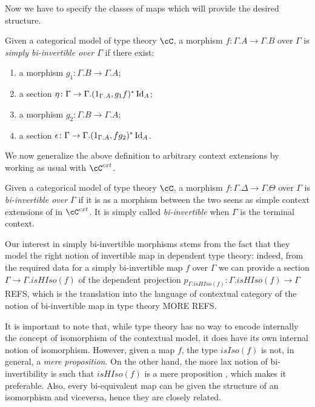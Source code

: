 Now we have to specify the classes of maps which will provide the desired
structure.

\begin{defn}
  Given a categorical model of type theory $\cC$, a morphism
  $f\colon\Gamma.A\rightarrow\Gamma.B$ over $\Gamma$ is \emph{simply
    bi-invertible over $\Gamma$} if there exist:
  \begin{enumerate}
    \item a morphism $g_1\colon\Gamma.B\rightarrow\Gamma.A$;
    \item a section
      $\eta\colon\Gamma\rightarrow\Gamma.(1_{\Gamma.A},g_1f)^*\operatorname{Id}_{A}$;
    \item a morphism $g_2\colon\Gamma.B\rightarrow\Gamma.A$;
    \item a section
      $\epsilon\colon\Gamma\rightarrow\Gamma.(1_{\Gamma.A},fg_2)^*\operatorname{Id}_{A}$.
  \end{enumerate}
\end{defn}

We now generalize the above definition to arbitrary context extensions by
working as usual with $\cC^{cxt}$.

\begin{defn}
  Given a categorical model of type theory $\cC$, a morphism
  $f\colon\Gamma.\Delta\rightarrow\Gamma.\Theta$ over $\Gamma$ is
  \emph{bi-invertible over $\Gamma$} if it is as a morphism between the two
  seens as simple context extensions of in $\cC^{cxt}$. It
  is simply called \emph{bi-invertible} when $\Gamma$ is the terminal
  context.
\end{defn}

\begin{rmk}
  Our interest in simply bi-invertible morphisms stems from the fact that they
  model the right notion of invertible map in dependent type theory: indeed,
  from the
  required data for a simply bi-invertible map $f$ over $\Gamma$ we can provide
  a section $\Gamma\rightarrow\Gamma.isHIso(f)$ of the dependent projection
  $p_{\Gamma.isHIso(f)}\colon\Gamma.isHIso(f)\rightarrow\Gamma$ REFS, which is
  the translation into the language of contextual category of the notion of
  bi-invertible map in type theory MORE REFS.

  It is important to note that, while type theory has no way to encode
  internally the concept of isomorphism of the contextual model, it does have
  its own internal notion of isomorphism. However, given a map $f$, the type
  $isIso(f)$ is not, in general, a \emph{mere proposition}. On the other hand,
  the more lax notion of bi-invertibility is such that $isHIso(f)$ is a mere
  proposition , which makes it
  preferable. Also, every bi-equivalent map can be given the structure of an
  isomorphism and viceversa, hence they are closely related.
\end{rmk}

